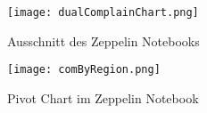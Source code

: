 \begin{figure}[h] 
	\centering
	\texttt{[image: dualComplainChart.png]}
	\caption[Ausschnitt des Notebooks]{Ausschnitt des Zeppelin Notebooks}
	\label{fig:zeppelin1}
\end{figure}
\begin{figure}[h] 
	\centering
	\texttt{[image: comByRegion.png]}
	\caption[Pivot Chart im Zeppelin Notebook]{Pivot Chart im Zeppelin Notebook}
	\label{fig:zeppelin3}
\end{figure}


